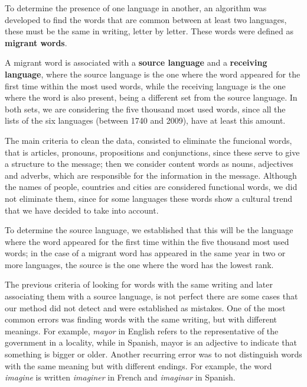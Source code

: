 \documentclass[10pt,letterpaper]{article} %
\begin{document}

To determine the presence of one language in another, an algorithm was
developed to find the words that are common between at least two languages,
these must be the same in writing, letter by letter. These words were defined as \textbf{migrant words}. 

A migrant word is associated with a \textbf{source language} and a
\textbf{receiving language}, where the source language is the one where the
word appeared for the first time within the most used words,
while the receiving language is the one where the word is also present, being a
different set from the source language. In both sets, we are considering the five thousand most used words, since all the lists of the six languages (between 1740 and 2009), have at least this amount.  

The main criteria to clean the data, consisted to eliminate the funcional words, that is articles, pronouns, propositions and conjunctions, since these serve to give a structure to the message;  then we consider content words as nouns, adjectives and adverbs, which are responsible for the information in the message. Although the names of people, countries and cities are considered functional words, we did not eliminate them, since for some languages these words show a cultural trend that we have decided to take into account.

To determine the source language, we established that this will be the language where the word appeared for the first time within the five thousand most used words; in the case of a migrant word has appeared in the same year in two or more languages, the source is the one where the word has the lowest rank.




The previous criteria of looking for words with the same writing and later
associating them with a source language, is not perfect there are some cases that our method did not detect and were established as mistakes. One of the most common errors was finding words with the same writing, but with different meanings. For example,  \textit{mayor} in English refers to the representative of the government in a locality, while in Spanish,  mayor is an adjective to indicate that something
is bigger or older.  Another recurring error was to not distinguish words with the same meaning but with different endings. For example, the word \textit{imagine} is written \textit{imaginer} in French and \textit{imaginar} in Spanish.
\end{document}
